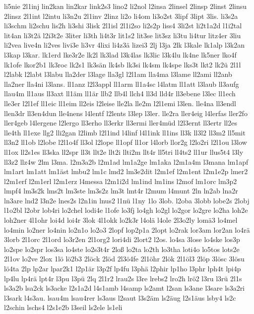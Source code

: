 {li5nie
2l1inj
lin2kan
lin2kar
link2s3
lino2
li2nol
l2insa
2linsel
2linsp
2linst
2linsu
2linsz
2l1int
l2intu
li3n2u
2l1inv
2linz
li2o
li4om
li3o2st
3lipf
3lipt
3lis.
li3s2a
li3schm
li2schu
lis2h
li3shi
3lisk
2l1isl
2l1i2so
li2s2p
liss4
3li2st
li2t1a2d
l1i2tal
lit4an
li3t2ä
l2i3t2e
3liter
li3th
li4t3r
lit1s2
lit3se
lit3sz
li3tu
li4tur
litz4er
3liu
li2vea
live4n
li2ves
livi3e
li3vr
4lixi
li4z3ä
lizei3
2lj
l3ja
2lk
l3kale
lk1alp
l3k2an
l3kap
l3kar.
lk1erd
lke3r2e
lk2l
lk3lad
l3k4las
lk3lic
l3k4lu
lk4ne
lk5ner
lko4f
lk1ofe
lkor2b1
lk3roc
lk2s1
lk3sän
lk4sb
lk3si
lk4sm
lk4spe
lks3t
lkt2
lk2ü
2l1l
l2labk
l2labt
l3labu
lla2der
l3lage
lla3gl
l2l1am
lla4ma
l3lame
ll2ami
ll2anb
lla2ner
lla4ni
l3lans.
ll1anz
l2l3appl
ll1arm
ll1a4sc
l4latm
ll1att
l3laub
ll3aufg
llau4m
ll1aus
ll3axt
ll1äm
ll1är
llb2
llb4l
llch4
ll3d
lld4r
ll3ebene
l3lec
ll1ech
lle3er
l2l1ef
ll1eic
ll1eim
ll2eis
l2leise
lle2la
lle2m
l2l1emi
l3len.
lle4na
ll3endl
llen3dr
ll3en4dun
lle4nens
l4lentf
l2lents
l3lep
l3ler.
lle2ra
ller4eig
l4lerfas
ller2fo
ller4geb
l4lergene
l2lergo
ll3erho
ll3erkr
ll3ermi
ller4müd
l2l3ernt
ll3ertr
ll2es
lle4th
ll1exe
llg2
lli2gan
l2limb
l2l1ind
l4linf
l4l1ink
ll1ins
ll3k
ll3l2
ll3m2
ll5mit
ll3n2
ll1ob
l2lobe
l2l1o4f
ll3ol
l2lope
ll1opf
ll1or
l4lorb
llor2g
l2lo2ri
l2l1ou
l3low
ll1ox
ll2s1es
ll3ska
ll2spr
ll3t
llt2e
llt2i
llti2m
llt4r
ll5tri
ll4ts2
ll1ur
llus5t4
l3ly
ll3z2
llz4w
2lm
l3ma.
l2m3a2b
l2m1ad
lm1a2ge
lm1aka
l2m1a4m
l3mana
lm1apf
lm1art
lm1att
lm1äst
lmbu2
lm1c
lmd2
lm3e2dit
l2m1ef
l2m1ent
l2m1e2p
lmer2
l2m1erf
l2m1erl
l2m1erz
l4messa
l2m1i2d
lm1ind
lm1ins
l2mof
lm1orc
lm3p2
lmpf4
lm3s2k
lms2t
lm3ste
lm3s2z
lm3t
lmt4r
l2mum
l4munt
2ln
ln2ab
lna2r
ln3are
lnd2
l3n2e
lnes2s
l2n1in
lnus2
l1nü
l1ny
1lo
3lob.
l2oba
3lobb
lobe2s
2lobj
l1o2bl
l2obr
lob4ri
lo2chel
lodi4e
l1ofe
lo3fj
lo4gh
lo2gl
lo2gor
lo2gre
lo2ha
loh2e
loh2ner
4l1ohr
loi4d
loi4r
3lok
4l1okk
lo2k3r
l4olä
l4ole
2l3o2ly
lomä3
lo4mel
lo4min
lo2ner
lo4nin
lo2n1o
lo2o3
2lopf
lop2p1a
2lopt
lo2rak
lor3am
lor2an
lo4rä
3lorb
2l1orc
2l1ord
lo3r2en
2l1org2
lori4di
2lort2
l2os.
lo4sa
3lose
lo4ske
los3p
lo2spe
lo2spr
los3sa
lo4ste
lo2s3t4r
2loß
lo2ta
lo2th
lo3tha
loti4o
lo5tos
lots2e
2l1ov
lo2ve
2lox
1lö
lö2b3
2löck
2löd
2l3ö4fe
2l1öhr
2lök
2l1öl3
2löp
3lösc
3lösu
lö4ta
2lp
lp2ar
lpar2k1
l2p1är
l3p2f
lp4fu
l3phä
l2phir
lp1ho
l3phr
lph4t
lpi4p
lp4lu
lp4rä
lpt4r
l3pu
l3pü
2lq
2l1r2
lrau2s
l3re
lrebs2
lro2h
lrö2
l3ru
l3rü
2l1s
ls3a2b
lsa2ck
ls3acke
l2s1a2d
l4s1amb
l4samp
ls2amt
l2san
ls3ane
l3sare
ls3a2ri
l3sark
l4s3au.
lsau4m
lsau4rer
ls3aus
l2saut
l3s2äm
ls2äug
l2s1äus
lsby4
ls2c
l2schin
lschs4
l2s1e2b
l3seil
ls2ele
ls1eli
}
